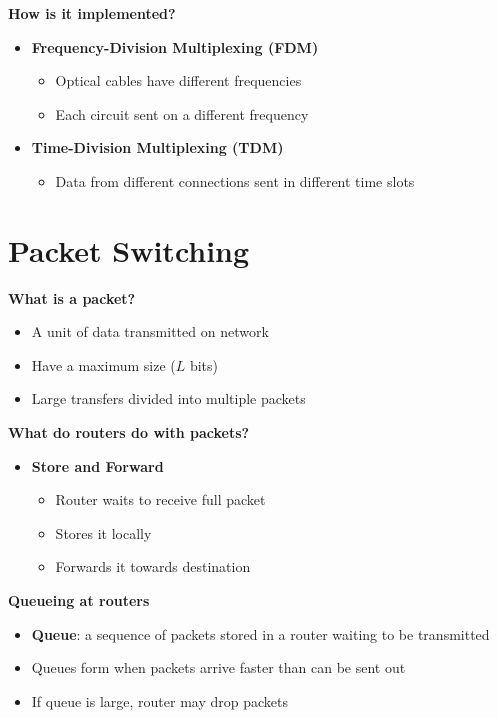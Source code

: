 \documentclass[9pt]{extarticle}
\begin{document}
\begin{multicols*}{3}
\textbf{How is it implemented?}
\begin{itemize}
    \item \textbf{Frequency-Division Multiplexing (FDM)}
    \begin{itemize}
        \item Optical cables have different frequencies
        \item Each circuit sent on a different frequency
    \end{itemize}
    \item \textbf{Time-Division Multiplexing (TDM)}
    \begin{itemize}
        \item Data from different connections sent in different time slots
    \end{itemize}
\end{itemize}

{\color{sectioncolor}\section*{\centering Packet Switching}}
\textbf{What is a packet?}
\begin{itemize}
    \item A unit of data transmitted on network
    \item Have a maximum size (\( L \) bits)
    \item Large transfers divided into multiple packets
\end{itemize}

\textbf{What do routers do with packets?}
\begin{itemize}
    \item \textbf{Store and Forward}
    \begin{itemize}
        \item Router waits to receive full packet
        \item Stores it locally
        \item Forwards it towards destination
    \end{itemize}
\end{itemize}

\textbf{Queueing at routers}
\begin{itemize}
    \item \textbf{Queue}: a sequence of packets stored in a router waiting to be transmitted
    \item Queues form when packets arrive faster than can be sent out
    \item If queue is large, router may drop packets
\end{itemize}


\end{multicols*}
\end{document}
